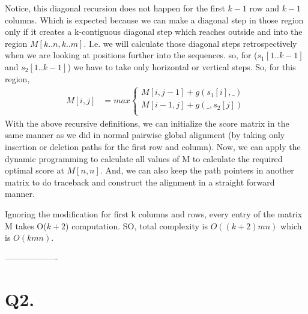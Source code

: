 \documentclass[a4paper,11pt]{article}
\begin{document}
Notice, this diagonal recursion does not happen for the first  $k-1$ row and $k-1$ columns. Which is expected because we can make a diagonal step in those region only if it creates a k-contiguous diagonal step which reaches outside and into the region $M[k..n,k..m]$. I.e. we will calculate those diagonal steps retrospectively when we are looking at positions further into the sequences.
so, for ($s_1[1..k-1]$ and $s_2[1..k-1]$) we have to take only horizontal or vertical steps. So, for this region,
\begin{align*}
 M[i,j] &= max\begin{cases}
               M[i,j-1] + g(s_1[i],\_)\\
               M[i-1,j] + g(\_,s_2[j])\\
              \end{cases}
\end{align*}
With the above recursive definitions, we can initialize the score matrix in the same manner as we did in normal pairwise global alignment (by taking only insertion or deletion paths for the first row and column). Now, we can apply the dynamic programming to calculate all values of M to calculate the required optimal score at $M[n,n]$. And, we can also keep the path pointers in another matrix to do traceback and construct the alignment in a straight forward manner.

Ignoring the modification for first k columns and rows, every entry of the matrix M takes O($k+2$) computation. SO, total complexity is $O((k+2)mn)$ which is $O(kmn)$.
\begin{center}
 -------------------
\end{center}

\section*{Q2.}
\end{document}
